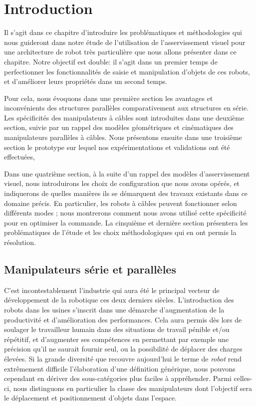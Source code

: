 \chapter{Introduction}

Il s'agit dans ce chapitre d'introduire les problématiques et méthodologies qui nous guideront dans notre étude de l'utilisation de l'asservissement visuel pour une architecture de robot très particulière que nous allons présenter dans ce chapitre. Notre objectif est double: il s'agit dans un premier temps de perfectionner les fonctionnalités de saisie et manipulation d'objets de ces robots, et d'améliorer leurs propriétés dans un second temps.

Pour cela, nous  évoquons dans une première section les avantages et inconvénients des structures parallèles comparativement aux structures en série. Les spécificités des manipulateurs à c\^ables sont introduites dans une deuxième section, suivie par un rappel des modèles géométriques et cinématiques des manipulateurs parallèles à c\^ables. Nous présentons ensuite dans une troisième section le prototype sur lequel nos expérimentations et validations ont été effectuées,

Dans une quatrième section, à la suite d'un rappel des modèles d'asser\-vissement visuel, nous introduirons les choix de configuration que nous avons opérés, et indiquerons de quelles manières ils se démarquent des travaux existants dans ce domaine précis. En particulier, les robots à câbles peuvent fonctionner selon différents modes ; nous montrerons comment nous avons utilisé cette spécificité pour en optimiser la commande. La cinquième et dernière section présentera les problématiques de l'étude et les choix méthodologiques qui en ont permis la résolution.

\section{Manipulateurs série et parallèles}

C'est incontestablement l'industrie qui aura été le principal vecteur de développe\-ment de la robotique ces deux derniers siècles. L'introduction des robots dans les usines s'inscrit dans une démarche d'augmentation de la productivité et d'amélio\-ration des performances. Cela aura permis dès lors de soulager le travailleur humain dans des situations de travail pénible et/ou répétitif, et d'augmenter ses compétences en permettant par exemple une précision qu'il ne saurait fournir seul, ou la possibilité de déplacer des charges élevées. Si la grande diversité que recouvre aujourd'hui le terme de {\it robot} rend extrêmement difficile l'élaboration d'une définition générique, nous pouvons cependant en dériver des sous-catégories plus faciles à appréhender. Parmi celles-ci, nous distinguons en particulier la classe des manipulateurs dont l'objectif sera le déplacement et positionnement d'objets dans l'espace.

